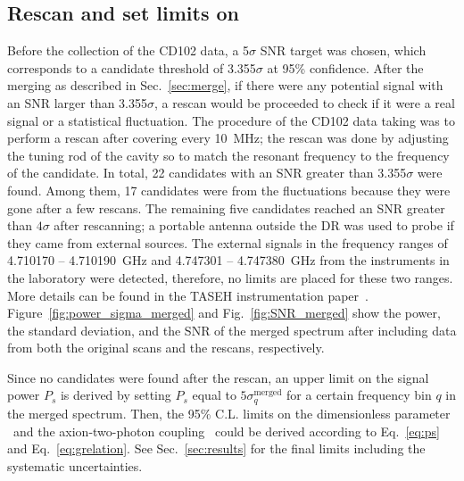 \subsection{Rescan and set limits on \gagg} 
Before the collection of the CD102 data, a 5$\sigma$ SNR target was chosen, 
which corresponds to a candidate threshold of 3.355$\sigma$ at 95\% confidence.
 After the merging as described in Sec.~\ref{sec:merge}, if there were 
any potential signal with an SNR larger than 
3.355$\sigma$, a rescan would be proceeded to check if it were a real signal 
or a statistical fluctuation. 
The procedure of the CD102 data taking was to perform a rescan after 
covering every 10~MHz; the rescan was done by adjusting the tuning rod of the 
cavity so to match the resonant frequency to the frequency of the candidate. 
In total, 22 candidates with an SNR greater than 3.355$\sigma$ were found. 
Among them, 17 candidates were from the fluctuations because they were gone 
after a few rescans. 
The remaining five candidates reached an SNR greater than $4\sigma$ after 
rescanning; a 
portable antenna outside the DR was used to probe if they came from external 
sources. 
The external signals in the frequency ranges of 4.710170 -- 4.710190~GHz and 
4.747301 -- 4.747380~GHz from the instruments in the laboratory were detected, 
therefore, no limits are placed for these two ranges.  
More details can be found in the 
TASEH instrumentation paper~\cite{TASEHInstrumentation}. 
Figure~\ref{fig:power_sigma_merged} and Fig.~\ref{fig:SNR_merged} show the 
power, the standard deviation, and the SNR of the merged spectrum after 
including data from both the original scans and the rescans, respectively. 

Since no candidates were found after the rescan, an upper limit on 
the signal power $P_s$ is derived by setting $P_s$ equal to 
$5\sigma_{q}^\text{merged}$ for a certain frequency bin $q$ in the merged 
spectrum.  Then, the 95\% C.L. limits on the dimensionless parameter 
\ggamma\ and the axion-two-photon coupling \gagg\ could be derived 
according to Eq.~\eqref{eq:ps} and Eq.~\eqref{eq:grelation}. 
See Sec.~\ref{sec:results} for the final limits including the systematic 
uncertainties.

